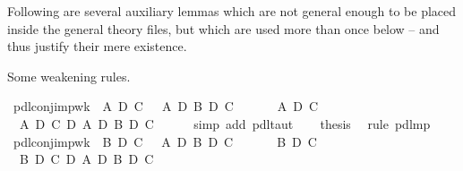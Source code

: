 \begin{isabellebody}
\begin{isamarkuptext}
Following are several auxiliary lemmas which are not general enough to be placed
  inside the general theory files, but which are used more than once below -- and thus
  justify their mere existence.%
\end{isamarkuptext}%
\isamarkuptrue%
%
\begin{isamarkuptext}%
Some weakening rules.%
\end{isamarkuptext}%
\isamarkuptrue%
\ pdl{\isacharunderscore}conj{\isacharunderscore}imp{\isacharunderscore}wk{}{\isacharcolon}\ {\isachardoublequote}{\isasymturnstile}\ A\ {\isasymlongrightarrow}\isactrlsub D\ C\ {\isasymLongrightarrow}\ {\isasymturnstile}\ A\ {\isasymand}\isactrlsub D\ B\ {\isasymlongrightarrow}\isactrlsub D\ C{\isachardoublequote}\isanewline
\isamarkupfalse%
\ {\isacharminus}\isanewline
\ \ \isamarkupfalse%
\ {\isachardoublequote}{\isasymturnstile}\ A\ {\isasymlongrightarrow}\isactrlsub D\ C{\isachardoublequote}\isanewline
\ \ \isamarkupfalse%
\ {\isachardoublequote}{\isasymturnstile}\ {\isacharparenleft}A\ {\isasymlongrightarrow}\isactrlsub D\ C{\isacharparenright}\ {\isasymlongrightarrow}\isactrlsub D\ A\ {\isasymand}\isactrlsub D\ B\ {\isasymlongrightarrow}\isactrlsub D\ C{\isachardoublequote}\isanewline
\ \ \ \ \isamarkupfalse%
\ {\isacharparenleft}simp\ add{\isacharcolon}\ pdl{\isacharunderscore}taut{\isacharparenright}\isanewline
\ \ \isamarkupfalse%
\ {\isacharquery}thesis\ \isamarkupfalse%
\ {\isacharparenleft}rule\ pdl{\isacharunderscore}mp{\isacharparenright}\isanewline
\isamarkupfalse%
\isanewline
\isanewline
\isamarkupfalse%
\ pdl{\isacharunderscore}conj{\isacharunderscore}imp{\isacharunderscore}wk{}{\isacharcolon}\ {\isachardoublequote}{\isasymturnstile}\ B\ {\isasymlongrightarrow}\isactrlsub D\ C\ {\isasymLongrightarrow}\ {\isasymturnstile}\ A\ {\isasymand}\isactrlsub D\ B\ {\isasymlongrightarrow}\isactrlsub D\ C{\isachardoublequote}\isanewline
\isamarkupfalse%
\ {\isacharminus}\isanewline
\ \ \isamarkupfalse%
\ {\isachardoublequote}{\isasymturnstile}\ B\ {\isasymlongrightarrow}\isactrlsub D\ C{\isachardoublequote}\isanewline
\ \ \isamarkupfalse%
\ {\isachardoublequote}{\isasymturnstile}\ {\isacharparenleft}B\ {\isasymlongrightarrow}\isactrlsub D\ C{\isacharparenright}\ {\isasymlongrightarrow}\isactrlsub D\ A\ {\isasymand}\isactrlsub D\ B\ {\isasymlongrightarrow}\isactrlsub D\ C{\isachardoublequote}\isanewline

\end{isabellebody}
